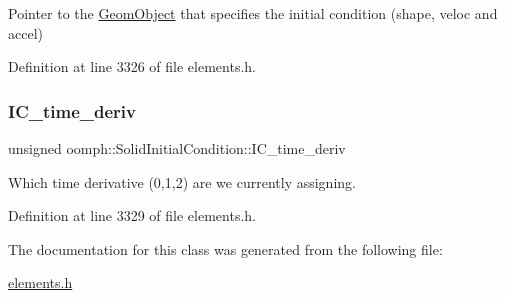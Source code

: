 Pointer to the \hyperlink{classoomph_1_1GeomObject}{Geom\+Object} that specifies the initial condition (shape, veloc and accel) 



Definition at line 3326 of file elements.\+h.

\mbox{\label{classoomph_1_1SolidInitialCondition_aae8a896ccc0c0565922cb60f4f7ebd15}} 
\subsubsection{\texorpdfstring{I\+C\+\_\+time\+\_\+deriv}{IC\_time\_deriv}}
{\footnotesize\ttfamily unsigned oomph\+::\+Solid\+Initial\+Condition\+::\+I\+C\+\_\+time\+\_\+deriv\hspace{0.3cm}{\ttfamily [private]}}



Which time derivative (0,1,2) are we currently assigning. 



Definition at line 3329 of file elements.\+h.



The documentation for this class was generated from the following file\+:\begin{DoxyCompactItemize}
\item 
\hyperlink{elements_8h}{elements.\+h}\end{DoxyCompactItemize}
